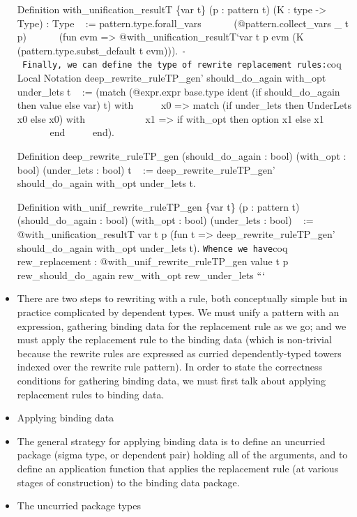 \begin{itemize}
  Definition with\_unification\_resultT \{var t\} (p : pattern t) (K :
  type -\textgreater{} Type) : Type ~ := pattern.type.forall\_vars ~ ~ ~
  ~(@pattern.collect\_vars \_ t p) ~ ~ ~ ~(fun evm =\textgreater{}
  @with\_unification\_resultT`var t p evm (K
  (pattern.type.subst\_default t evm))).
  \texttt{-\ Finally,\ we\ can\ define\ the\ type\ of\ rewrite\ replacement\ rules:}coq
  Local Notation deep\_rewrite\_ruleTP\_gen' should\_do\_again with\_opt
  under\_lets t ~ := (match (@expr.expr base.type ident (if
  should\_do\_again then value else var) t) with ~ ~ ~ \textbar{} x0
  =\textgreater{} match (if under\_lets then UnderLets x0 else x0) with
  ~ ~ ~ ~ ~ ~ ~ \textbar{} x1 =\textgreater{} if with\_opt then option
  x1 else x1 ~ ~ ~ ~ ~ ~ ~ end ~ ~ ~ end).

  Definition deep\_rewrite\_ruleTP\_gen (should\_do\_again : bool)
  (with\_opt : bool) (under\_lets : bool) t ~ :=
  deep\_rewrite\_ruleTP\_gen' should\_do\_again with\_opt under\_lets t.

  Definition with\_unif\_rewrite\_ruleTP\_gen \{var t\} (p : pattern t)
  (should\_do\_again : bool) (with\_opt : bool) (under\_lets : bool) ~
  := @with\_unification\_resultT var t p (fun t =\textgreater{}
  deep\_rewrite\_ruleTP\_gen' should\_do\_again with\_opt under\_lets
  t). \texttt{Whence\ we\ have}coq rew\_replacement :
  @with\_unif\_rewrite\_ruleTP\_gen value t p rew\_should\_do\_again
  rew\_with\_opt rew\_under\_lets ```
\item
  There are two steps to rewriting with a rule, both conceptually simple
  but in practice complicated by dependent types. We must unify a
  pattern with an expression, gathering binding data for the replacement
  rule as we go; and we must apply the replacement rule to the binding
  data (which is non-trivial because the rewrite rules are expressed as
  curried dependently-typed towers indexed over the rewrite rule
  pattern). In order to state the correctness conditions for gathering
  binding data, we must first talk about applying replacement rules to
  binding data.
\item
  Applying binding data
\item
  The general strategy for applying binding data is to define an
  uncurried package (sigma type, or dependent pair) holding all of the
  arguments, and to define an application function that applies the
  replacement rule (at various stages of construction) to the binding
  data package.
\item
  The uncurried package types


\end{itemize}
